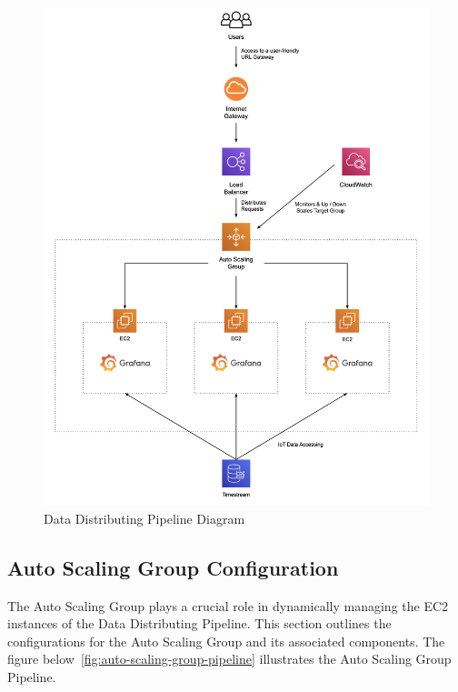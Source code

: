 \documentclass[12pt,oneside]{book} %
\begin{document}
\begin{figure}[H]
    \centering
    \includegraphics[width=1\linewidth]{images/cloud-computing-clients.png}
    \caption{Data Distributing Pipeline Diagram}\label{fig:data-distributing-pipeline}
\end{figure}

\newpage
\subsection{Auto Scaling Group Configuration}

The Auto Scaling Group plays a crucial role in dynamically managing the EC2
instances of the Data Distributing Pipeline. This section outlines the
configurations for the Auto Scaling Group and its associated components. The
figure below~\ref{fig:auto-scaling-group-pipeline} illustrates the Auto Scaling
Group Pipeline.
\end{document}
